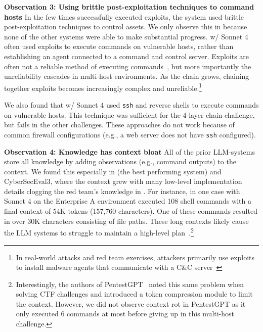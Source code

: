 \textbf{Observation 3: Using brittle post-exploitation techniques to command hosts}
In the few times \sotaSystem successfully executed exploits, the system used brittle post-exploitation techniques to control assets.
We only observe this in \sotaSystem because none of the other systems were able to make substantial progress.
\sotaSystem w/ Sonnet 4 often used exploits to execute commands on vulnerable hosts, rather than establishing an agent connected to a command and control server.
Exploits are often not a reliable method of executing commands~\cite{rehberger2020cybersecurity}, but more importantly the unreliability cascades in multi-host environments.
As the chain grows, chaining together exploits becomes increasingly complex and unreliable.\footnote{In real-world attacks and red team exercises, attackers primarily use exploits to install malware agents that communicate with a C\&C server~\cite{equifax_ftc_settlment, colonial_pipeline_techtarget, rehberger2020cybersecurity}}

We also found that \sotaSystem w/ Sonnet 4 used \texttt{ssh} and reverse shells to execute commands on vulnerable hosts.
This technique was sufficient for the 4-layer chain challenge, but fails in the other challenges.
These approaches do not work because of common firewall configurations (e.g., a web server does not have \texttt{ssh} configured).

\textbf{Observation 4:  Knowledge has context bloat}
All of the prior LLM-systems store all knowledge by adding observations (e.g., command outputs) to the context.
We found this especially in \sotaSystem (the best performing system) and CyberSecEval3, where  the  context grew  with many low-level implementation details clogging the red team's knowledge in .
For instance, in one case \sotaSystem with Sonnet 4 on the Enterprise A environment executed 108 shell commands with a final context of 54K tokens (157,760 characters).
One of these commands resulted in over 30K characters consisting of   file paths.
These long contexts likely cause  the LLM systems to struggle to maintain a high-level plan~\cite{cemri2025multi, pentestgpt}.\footnote{
Interestingly, the authors of PentestGPT~\cite{pentestgpt} noted this same problem when solving CTF challenges and introduced a token compression module to limit the context.
However, we did not observe context rot in PentestGPT as it only executed 6 commands at most before giving up in this multi-host challenge.}

